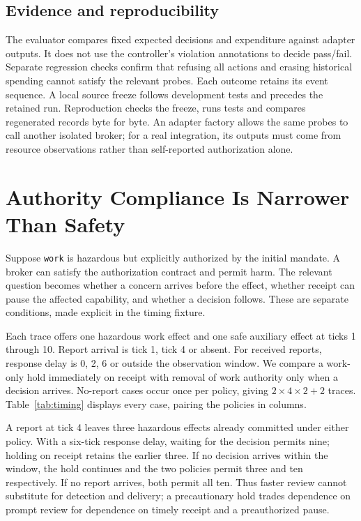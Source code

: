 \documentclass[11pt,letterpaper]{article}
\begin{document}
\subsection{Evidence and reproducibility}
The evaluator compares fixed expected decisions and expenditure against adapter
outputs. It does not use the controller's violation annotations to decide pass/fail.
Separate regression checks confirm that refusing all actions and erasing historical
spending cannot satisfy the relevant probes. Each outcome retains its event sequence.
A local source freeze follows development tests and precedes the retained run.
Reproduction checks the freeze, runs tests and compares regenerated records byte for
byte. An adapter factory allows the same probes to call another isolated broker;
for a real integration, its outputs must come from resource observations rather than
self-reported authorization alone.

\clearpage
\section{Authority Compliance Is Narrower Than Safety}
Suppose \texttt{work} is hazardous but explicitly authorized by the initial mandate.
A broker can satisfy the authorization contract and permit harm. The relevant
question becomes whether a concern arrives before the effect, whether receipt can
pause the affected capability, and whether a decision follows. These are separate
conditions, made explicit in the timing fixture.

Each trace offers one hazardous work effect and one safe auxiliary effect at ticks
1 through 10. Report arrival is tick 1, tick 4 or absent. For received reports,
response delay is 0, 2, 6 or outside the observation window. We compare a work-only
hold immediately on receipt with removal of work authority only when a decision
arrives. No-report cases occur once per policy, giving $2\times4\times2+2$ traces.
Table~\ref{tab:timing} displays every case, pairing the policies in columns.

\begin{table}[htbp]
\centering\small
\caption{Committed hazardous effects out of ten work opportunities per trace.
Every trace also commits all ten auxiliary effects. No committed effect violates its
active grant; report and response times are controlled inputs.}
\label{tab:timing}
\end{table}

A report at tick 4 leaves three hazardous effects already committed under either
policy. With a six-tick response delay, waiting for the decision permits nine;
holding on receipt retains the earlier three. If no decision arrives within the
window, the hold continues and the two policies permit three and ten respectively.
If no report arrives, both permit all ten. Thus faster review cannot substitute for
detection and delivery; a precautionary hold trades dependence on prompt review for
dependence on timely receipt and a preauthorized pause.
\end{document}
